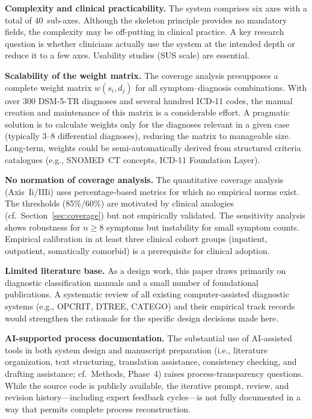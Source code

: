 \documentclass[11pt,a4paper]{article}
\begin{document}
\textbf{Complexity and clinical practicability.} The system comprises six axes with a total of 40~sub-axes. Although the skeleton principle provides no mandatory fields, the complexity may be off-putting in clinical practice. A key research question is whether clinicians actually use the system at the intended depth or reduce it to a few axes. Usability studies (SUS scale) are essential.

\textbf{Scalability of the weight matrix.} The coverage analysis presupposes a complete weight matrix $w(s_i, d_j)$ for all symptom--diagnosis combinations. With over 300 DSM-5-TR diagnoses and several hundred ICD-11 codes, the manual creation and maintenance of this matrix is a considerable effort. A pragmatic solution is to calculate weights only for the diagnoses relevant in a given case (typically 3--8 differential diagnoses), reducing the matrix to manageable size. Long-term, weights could be semi-automatically derived from structured criteria catalogues (e.g., SNOMED~CT concepts, ICD-11 Foundation Layer).

\textbf{No normation of coverage analysis.} The quantitative coverage analysis (Axis~Ii/IIIi) uses percentage-based metrics for which no empirical norms exist. The thresholds (85\%/60\%) are motivated by clinical analogies (cf.\ Section~\ref{sec:coverage}) but not empirically validated. The sensitivity analysis shows robustness for $n \geq 8$ symptoms but instability for small symptom counts. Empirical calibration in at least three clinical cohort groups (inpatient, outpatient, somatically comorbid) is a prerequisite for clinical adoption.

\textbf{Limited literature base.} As a design work, this paper draws primarily on diagnostic classification manuals and a small number of foundational publications. A systematic review of all existing computer-assisted diagnostic systems (e.g., OPCRIT, DTREE, CATEGO) and their empirical track records would strengthen the rationale for the specific design decisions made here.

\textbf{AI-supported process documentation.} The substantial use of AI-assisted tools in both system design and manuscript preparation (i.e., literature organization, text structuring, translation assistance, consistency checking, and drafting assistance; cf.\ Methods, Phase~4) raises process-transparency questions. While the source code is publicly available, the iterative prompt, review, and revision history---including expert feedback cycles---is not fully documented in a way that permits complete process reconstruction.
\end{document}
